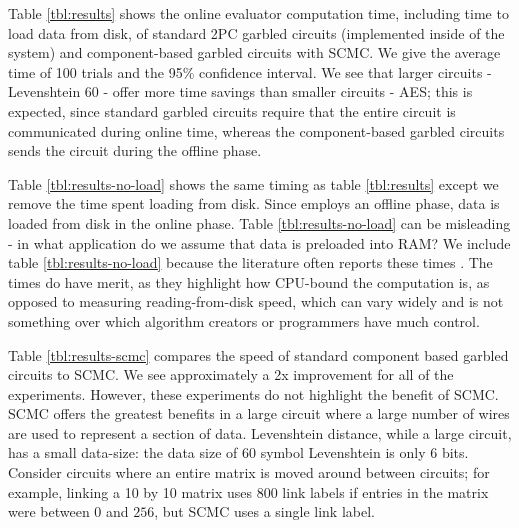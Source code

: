 Table \ref{tbl:results} shows the online evaluator computation time, including time to load data from disk, of standard 2PC garbled circuits (implemented inside of the \CompGC system) and component-based garbled circuits with SCMC.
We give the average time of 100 trials and the 95\% confidence interval.
We see that larger circuits - Levenshtein 60 - offer more time savings than smaller circuits - AES; this is expected, since standard garbled circuits require that the entire circuit is communicated during online time, whereas the component-based garbled circuits sends the circuit during the offline phase. 

Table \ref{tbl:results-no-load} shows the same timing as table \ref{tbl:results} except we remove the time spent loading from disk.
Since \CompGC employs an offline phase, data is loaded from disk in the online phase. 
Table \ref{tbl:results-no-load} can be misleading - in what application do we assume that data is preloaded into RAM?
We include table \ref{tbl:results-no-load} because the literature often reports these times \cite{blazing-fast}. 
The times do have merit, as they highlight how CPU-bound the computation is, as opposed to measuring reading-from-disk speed, which can vary widely and is not something over which algorithm creators or programmers have much control. 

Table \ref{tbl:results-scmc} compares the speed of standard component based garbled circuits to SCMC.
We see approximately a 2x improvement for all of the experiments. 
However, these experiments do not highlight the benefit of SCMC. 
SCMC offers the greatest benefits in a large circuit where a large number of wires are used to represent a section of data.
Levenshtein distance, while a large circuit, has a small data-size: the data size of 60 symbol Levenshtein is only 6 bits. 
Consider circuits where an entire matrix is moved around between circuits; for example, linking a 10 by 10 matrix uses $800$ link labels if entries in the matrix were between $0$ and $256$, but SCMC uses a single link label.

\newpage



\newpage



